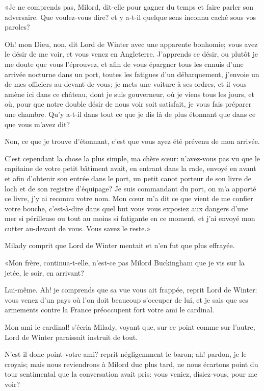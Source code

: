 «Je ne comprends pas, Milord, dit-elle pour gagner du temps et faire parler son adversaire. Que voulez-vous dire? et y a-t-il quelque sens inconnu caché sous vos paroles? 

\speak  Oh! mon Dieu, non, dit Lord de Winter avec une apparente bonhomie; vous avez le désir de me voir, et vous venez en Angleterre. J'apprends ce désir, ou plutôt je me doute que vous l'éprouvez, et afin de vous épargner tous les ennuis d'une arrivée nocturne dans un port, toutes les fatigues d'un débarquement, j'envoie un de mes officiers au-devant de vous; je mets une voiture à ses ordres, et il vous amène ici dans ce château, dont je suis gouverneur, où je viens tous les jours, et où, pour que notre double désir de nous voir soit satisfait, je vous fais préparer une chambre. Qu'y a-t-il dans tout ce que je dis là de plus étonnant que dans ce que vous m'avez dit? 

\speak  Non, ce que je trouve d'étonnant, c'est que vous ayez été prévenu de mon arrivée. 

\speak  C'est cependant la chose la plus simple, ma chère sœur: n'avez-vous pas vu que le capitaine de votre petit bâtiment avait, en entrant dans la rade, envoyé en avant et afin d'obtenir son entrée dans le port, un petit canot porteur de son livre de loch et de son registre d'équipage? Je suis commandant du port, on m'a apporté ce livre, j'y ai reconnu votre nom. Mon cœur m'a dit ce que vient de me confier votre bouche, c'est-à-dire dans quel but vous vous exposiez aux dangers d'une mer si périlleuse ou tout au moins si fatigante en ce moment, et j'ai envoyé mon cutter au-devant de vous. Vous savez le reste.» 

Milady comprit que Lord de Winter mentait et n'en fut que plus effrayée. 

«Mon frère, continua-t-elle, n'est-ce pas Milord Buckingham que je vis sur la jetée, le soir, en arrivant? 

\speak  Lui-même. Ah! je comprends que sa vue vous ait frappée, reprit Lord de Winter: vous venez d'un pays où l'on doit beaucoup s'occuper de lui, et je sais que ses armements contre la France préoccupent fort votre ami le cardinal. 

\speak  Mon ami le cardinal! s'écria Milady, voyant que, sur ce point comme sur l'autre, Lord de Winter paraissait instruit de tout. 

\speak  N'est-il donc point votre ami? reprit négligemment le baron; ah! pardon, je le croyais; mais nous reviendrons à Milord duc plus tard, ne nous écartons point du tour sentimental que la conversation avait pris: vous veniez, disiez-vous, pour me voir? 

